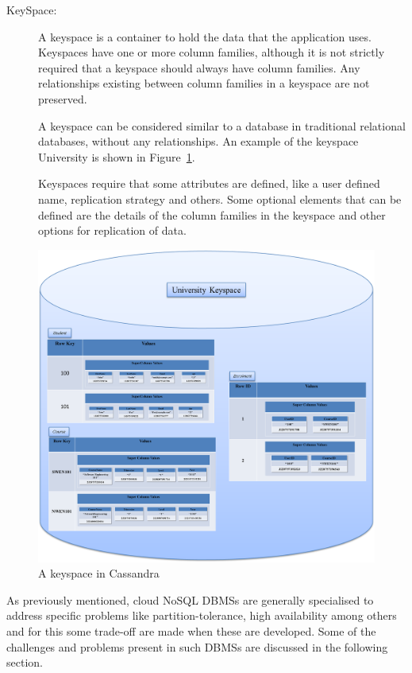 \begin{description}
\item [KeySpace:] A keyspace is a container to hold the data that the
application uses.  Keyspaces have one or more column families,   although it is not strictly
required that a keyspace should always have column families.  Any relationships
existing between column families in a keyspace are not preserved. 

A keyspace can be considered similar to a database in traditional relational
databases,   without any relationships.  An example of the keyspace
University is shown in Figure~\ref{f:keyspace}. 

Keyspaces require that some attributes are defined,   like a user defined name,  
replication strategy and others.  Some optional elements that can be defined are
the details of the column families in the keyspace and other options
for replication of data. 
\end{description}


\begin{figure}[h]
	\centering
	\includegraphics[width=.9\textwidth]{./figure/Example/KEYSPACE.png}
	\caption{A keyspace in
	Cassandra}\label{f:keyspace}
\end{figure}

As previously mentioned,  cloud \ac{NoSQL}
\acp{DBMS} are generally specialised to address specific problems like
partition-tolerance,  high availability among others and for this some
trade-off are made when these are developed.
Some of the challenges and problems present in such \acp{DBMS} are discussed in the following section.
